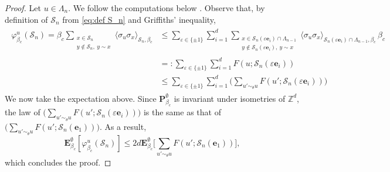 \documentclass[11pt,a4paper]{article}
\numberwithin{equation}{section}
\theoremstyle{plain}
\theoremstyle{definition}
\begin{document}
\begin{proof} Let $u\in \Lambda_n$. We follow the computations below \cite[Equation~(2.15)]{DuminilPanis2024newLB}. Observe that, by definition of $\mathcal S_n$ from \eqref{eq:def S_n} and Griffiths' inequality, 
\begin{align}\label{eq:pf lem prop 1}
\begin{aligned}
	\varphi_{\beta_c}^u(\mathcal S_n)=\beta_c\sum_{\substack{x\in \mathcal S_n\\ y\notin \mathcal S_n, \: y \sim x\\ }}\langle \sigma_u\sigma_x\rangle_{\mathcal S_n,\beta_c}&\leq \sum_{\varepsilon\in \{\pm 1\}}\sum_{i=1}^d \sum_{\substack{x\in \mathcal S_n(\varepsilon\mathbf{e}_i)\cap \Lambda_{n-1}\\y\notin \mathcal S_n(\varepsilon\mathbf{e}_i), \: y\sim x}}\langle \sigma_u\sigma_x\rangle_{\mathcal S_n(\varepsilon\mathbf{e}_i)\cap \Lambda_{n-1},\beta_c}\,\beta_c
	\\&=: \sum_{\varepsilon\in \{\pm 1\}}\sum_{i=1}^d F(u;\mathcal S_n(\varepsilon \mathbf{e}_i))\\&\leq \sum_{\varepsilon\in \{\pm 1\}}\sum_{i=1}^d \Big(\sum_{u'\sim_\theta u} F(u';\mathcal S_n(\varepsilon \mathbf{e}_i))\Big)
	\end{aligned}
\end{align}
We now take the expectation above. Since $\mathbf P_{\beta_c}^\emptyset$ is invariant under isometries of $\mathbb Z^d$, the law of $\Big(\sum_{u'\sim_\theta u} F(u';\mathcal S_n(\varepsilon \mathbf{e}_i))\Big)$ is the same as that of $\Big(\sum_{u'\sim_\theta u} F(u';\mathcal S_n(\mathbf{e}_1))\Big)$.
As a result,
\begin{equation}
	\mathbf E_{\beta_c}^\emptyset[\varphi_{\beta_c}^u(\mathcal S_n)]\leq 2d \mathbf E_{\beta_c}^\emptyset\Big[\sum_{u'\sim_\theta u} F(u';\mathcal S_n(\mathbf{e}_1))\Big],
\end{equation}
which concludes the proof.
\end{proof}
\end{document}
